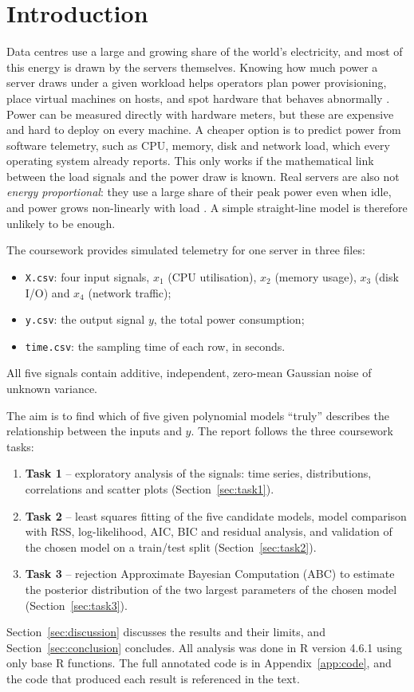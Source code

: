 \section{Introduction}

Data centres use a large and growing share of the world's electricity, and most of this energy is drawn by the servers themselves. Knowing how much power a server draws under a given workload helps operators plan power provisioning, place virtual machines on hosts, and spot hardware that behaves abnormally \citep{fan2007}. Power can be measured directly with hardware meters, but these are expensive and hard to deploy on every machine. A cheaper option is to predict power from software telemetry, such as CPU, memory, disk and network load, which every operating system already reports. This only works if the mathematical link between the load signals and the power draw is known. Real servers are also not \emph{energy proportional}: they use a large share of their peak power even when idle, and power grows non-linearly with load \citep{barroso2007}. A simple straight-line model is therefore unlikely to be enough.

The coursework provides simulated telemetry for one server in three files:
\begin{itemize}
  \item \texttt{X.csv}: four input signals, $x_1$ (CPU utilisation), $x_2$ (memory usage), $x_3$ (disk I/O) and $x_4$ (network traffic);
  \item \texttt{y.csv}: the output signal $y$, the total power consumption;
  \item \texttt{time.csv}: the sampling time of each row, in seconds.
\end{itemize}
All five signals contain additive, independent, zero-mean Gaussian noise of unknown variance.

The aim is to find which of five given polynomial models ``truly'' describes the relationship between the inputs and $y$. The report follows the three coursework tasks:
\begin{enumerate}
  \item \textbf{Task 1} -- exploratory analysis of the signals: time series, distributions, correlations and scatter plots (Section~\ref{sec:task1}).
  \item \textbf{Task 2} -- least squares fitting of the five candidate models, model comparison with RSS, log-likelihood, AIC, BIC and residual analysis, and validation of the chosen model on a train/test split (Section~\ref{sec:task2}).
  \item \textbf{Task 3} -- rejection Approximate Bayesian Computation (ABC) to estimate the posterior distribution of the two largest parameters of the chosen model (Section~\ref{sec:task3}).
\end{enumerate}
Section~\ref{sec:discussion} discusses the results and their limits, and Section~\ref{sec:conclusion} concludes. All analysis was done in R version 4.6.1 \citep{rcore2026} using only base R functions. The full annotated code is in Appendix~\ref{app:code}, and the code that produced each result is referenced in the text.
